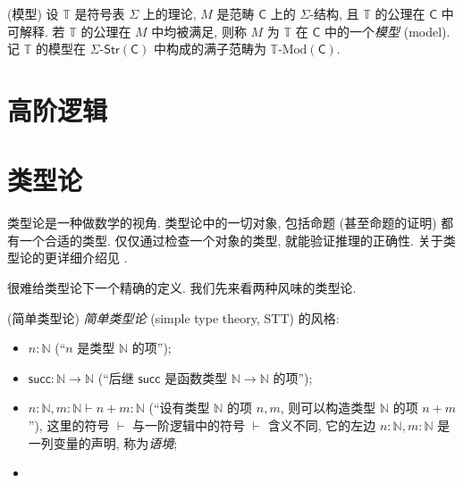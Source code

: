 \begin{definition}
	{(模型)}
	设 $\mathbb T$ 是符号表 $\Sigma$ 上的理论, $M$ 是范畴 $\mathsf C$ 上的 $\Sigma$-结构,
	且 $\mathbb T$ 的公理在 $\mathsf C$ 中可解释.
	若 $\mathbb T$ 的公理在 $M$ 中均被满足, 则称 $M$ 为 $\mathbb T$ 在 $\mathsf C$ 中的一个\emph{模型} (model).
	记 $\mathbb T$ 的模型在 $\Sigma\text{-}\mathsf{Str}(\mathsf C)$ 中构成的满子范畴为 $\mathbb T\text{-Mod}(\mathsf C)$.
\end{definition}

\section{高阶逻辑}

\todo{}

\section{类型论}

\label{appendix-type-theory}


类型论是一种做数学的视角. 类型论中的一切对象, 包括命题 (甚至命题的证明) 都有一个合适的类型. 仅仅通过检查一个对象的类型, 就能验证推理的正确性. 关于类型论的更详细介绍见 \cite{Trebor-History}.

很难给类型论下一个精确的定义. 我们先来看两种风味的类型论.

\begin{example}
	{(简单类型论)}
	\emph{简单类型论} (simple type theory, STT) 的风格:
	\begin{itemize}
		\item $n\colon \mathbb{N}$ (``$n$ 是类型 $\mathbb{N}$ 的项'');
		\item $\mathsf {succ}\colon \mathbb{N}\to\mathbb{N}$ (``后继 $\mathsf {succ}$ 是函数类型 $\mathbb{N}\to\mathbb{N}$ 的项'');
		\item $n\colon \mathbb{N},m\colon \mathbb{N} \vdash n+m \colon \mathbb{N}$ (``设有类型 $\mathbb{N}$ 的项 $n,m$, 则可以构造类型 $\mathbb{N}$ 的项 $n+m$''), 这里的符号 $\vdash$ 与一阶逻辑中的符号 $\vdash$ 含义不同, 它的左边 $n\colon \mathbb{N},m\colon \mathbb{N}$ 是一列变量的声明, 称为\emph{语境};
		\item
	\end{itemize}
	
\end{example}

